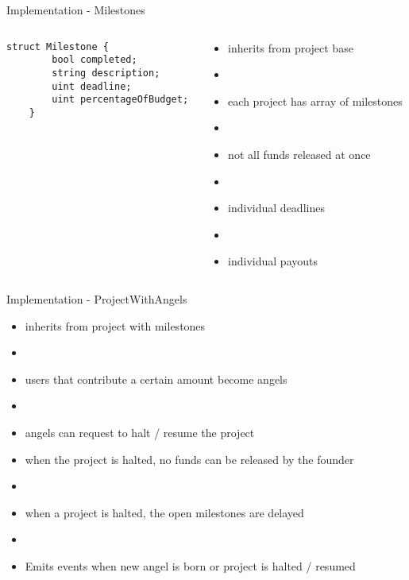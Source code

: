 \documentclass{beamer}
\begin{document}
\begin{frame}[fragile]{Implementation - Milestones}
\begin{columns}
\begin{column}{0.4\textwidth}
\centering
\begin{lstlisting}[basicstyle=\tiny]
    struct Milestone {
        bool completed;
        string description;
        uint deadline;
        uint percentageOfBudget;
    }
\end{lstlisting}
\end{column}
\begin{column}{0.6\textwidth}
\centering
	\begin{itemize}
		\item inherits from project base
		\item[]
		\item each project has array of milestones
		\item[]
		\item not all funds released at once
		\item[]
		\item individual deadlines
		\item[]
		\item individual payouts
	\end{itemize}
\end{column}
\end{columns}
\end{frame}


\begin{frame}{Implementation - ProjectWithAngels}
\begin{itemize}
    \item inherits from project with milestones
	\item[]
	\item users that contribute a certain amount become angels
	\item[]
	\item angels can request to halt / resume the project
	\item when the project is halted, no funds can be released by the founder
	\item[]
	\item when a project is halted, the open milestones are delayed
	\item[]
	\item Emits events when new angel is born or project is halted / resumed
\end{itemize}
\end{frame}
\end{document}
